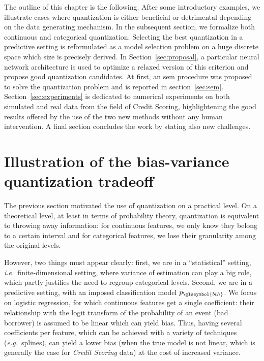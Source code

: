 The outline of this chapter is the following. After some introductory examples, we illustrate cases where quantization is either beneficial or detrimental depending on the data generating mechanism. In the subsequent section, we formalize both continuous and categorical quantization. Selecting the best quantization in a predictive setting is reformulated as a model selection problem on a huge discrete space which size is precisely derived. In Section~\ref{sec:proposal}, a particular neural network architecture is used to optimize a relaxed version of this criterion and propose good quantization candidates. At first, an \gls{sem} procedure was proposed to solve the quantization problem and is reported in section~\ref{sec:sem}. Section~\ref{sec:experiments} is dedicated to numerical experiments on both simulated and real data from the field of Credit Scoring, highlightening the good results offered by the use of the two new methods without any human intervention. A final section concludes the work by stating also new challenges.


\section{Illustration of the bias-variance quantization tradeoff}
 

The previous section motivated the use of quantization on a practical level. On a theoretical level, at least in terms of probability theory, quantization is equivalent to throwing away information: for continuous features, we only know they belong to a certain interval and for categorical features, we lose their granularity among the original levels.

However, two things must appear clearly: first, we are in a ``statistical'' setting, \textit{i.e.}\ finite-dimensional setting, where variance of estimation can play a big role, which partly justifies the need to regroup categorical levels. Second, we are in a predictive setting, with an imposed classification model $p_{\glssymbol{bth}}$. We focus on logistic regression, for which continuous features get a single coefficient: their relationship with the logit transform of the probability of an event (bad borrower) is assumed to be linear which can yield bias. Thus, having several coefficients per feature, which can be achieved with a  variety of techniques (\textit{e.g.}\ splines), can yield a lower bias (when the true model is not linear, which is generally the case for \textit{Credit Scoring} data) at the cost of increased variance.

